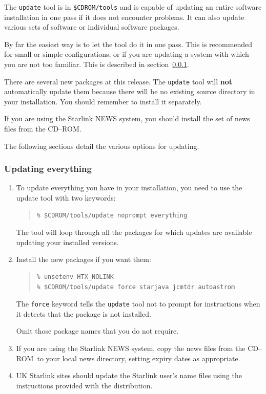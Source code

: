 \documentclass[twoside,11pt]{article}
\renewcommand{\_}{\texttt{\symbol{95}}}
\newcommand{\cdrom}{CD--ROM}
\newcommand{\cdrom}{CD-ROM}
\begin{document}
The \texttt{update} tool is in \texttt{\$CDROM/tools} and is capable
of updating an entire software installation in one pass if it does not
encounter problems.  It can also update various sets of software or
individual software packages.

By far the easiest way is to let the tool do it in one pass.  This is
recommended for small or simple configurations, or if you are updating
a system with which you are not too familiar.  This is described in
section~\ref{updating_everything}.

There are several new packages at this release.  The \texttt{update}
tool will \textbf{not} automatically update them because there will
be no existing source directory in your installation.  You
should remember to install it separately.

If you are using the Starlink NEWS system, you should install the set of
news files from the \cdrom.

The following sections detail the various options for updating.

\subsubsection{Updating everything}
\label{updating_everything}

\begin{enumerate}

\item To update everything you have in your installation, you need to use the
update tool with two keywords:

\begin{quote}
\begin{verbatim}
% $CDROM/tools/update noprompt everything
\end{verbatim}
\end{quote}

The tool will loop through all the packages for which updates are
available updating your installed versions.

\item Install the new packages if you want them:

\begin{quote}
\begin{verbatim}
% unsetenv HTX_NOLINK
% $CDROM/tools/update force starjava jcmtdr autoastrom
\end{verbatim}
\end{quote}

The \texttt{force} keyword tells the \texttt{update} tool not to prompt
for instructions when it detects that the package is not installed.  

Omit those package names that you do not require.

\item If you are using the Starlink NEWS system, copy the news files from the
\cdrom\ to your local news directory, setting expiry dates as appropriate.

\item UK Starlink sites should update the Starlink user's name files using
the instructions provided with the distribution.

\end{enumerate}
\end{document}
